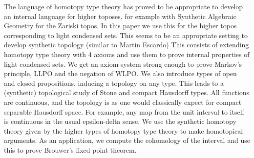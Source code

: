 The language of homotopy type theory has proved to be appropriate to develop an internal language for higher toposes, for example with Synthetic Algebraic Geometry for the Zariski topos.
In this paper we use this for the higher topos corresponding to light condensed sets.
This seems to be an appropriate setting to develop synthetic topology (similar to Martin Escardo)
This consists of extending homotopy type theory with 4 axioms and use them to prove internal properties of light condensed sets.
We get an axiom system strong enough to prove Markov's principle, LLPO and the negation of WLPO. 
We also introduce types of open and closed propositions, inducing a topology on any type. 
This leads to a (synthetic) topological study of Stone and compact Hausdorff types. 
All functions are continuous, and the topology is as one would classically expect for compact separable Hausdorff space.
For example, any map from the unit interval to itself is continuous in the usual epsilon-delta sense.
We use the synthetic homotopy theory given by the higher types of homotopy type theory to make homotopical arguments.
As an application, we compute the cohomology of the interval and use this to prove Brouwer's fixed point theorem. 
